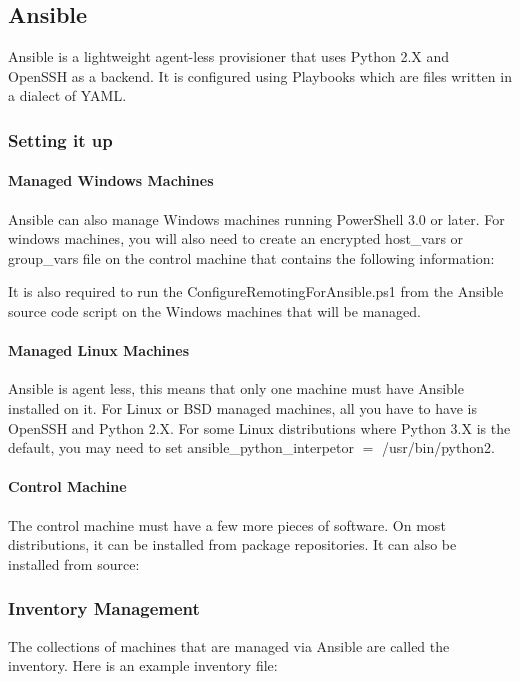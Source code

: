 \subsection{Ansible}
Ansible is a lightweight agent-less provisioner that uses Python 2.X and OpenSSH as a backend.
It is configured using Playbooks which are files written in a dialect of YAML.

\subsubsection{Setting it up}

\paragraph{Managed Windows Machines}
Ansible can also manage Windows machines running PowerShell 3.0 or later.
For windows machines, you will also need to create an encrypted host\_vars or group\_vars file on the control machine that contains the following information:


It is also required to run the ConfigureRemotingForAnsible.ps1 from the Ansible source code script on the Windows machines that will be managed.
\paragraph{Managed Linux Machines}
Ansible is agent less, this means that only one machine must have Ansible installed on it.
For Linux or BSD managed machines, all you have to have is OpenSSH and Python 2.X.
For some Linux distributions where Python 3.X is the default, you may need to set ansible\_python\_interpetor $=$ /usr/bin/python2.

\paragraph{Control Machine}
The control machine must have a few more pieces of software.
On most distributions, it can be installed from package repositories.
It can also be installed from source:



\subsubsection{Inventory Management}
The collections of machines that are managed via Ansible are called the inventory.  Here is an example inventory file:

